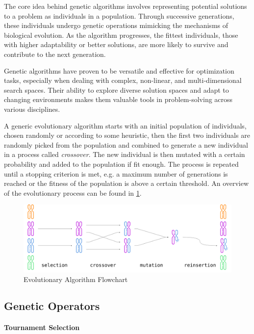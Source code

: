 The core idea behind genetic algorithms involves representing potential solutions to a problem as individuals in a population. Through successive generations, these individuals undergo genetic operations mimicking the mechanisms of biological evolution. As the algorithm progresses, the fittest individuals, those with higher adaptability or better solutions, are more likely to survive and contribute to the next generation.

Genetic algorithms have proven to be versatile and effective for optimization tasks, especially when dealing with complex, non-linear, and multi-dimensional search spaces. Their ability to explore diverse solution spaces and adapt to changing environments makes them valuable tools in problem-solving across various disciplines. \citep{gu_modified_2021}

A generic evolutionary algorithm starts with an initial population of individuals, chosen randomly or according to some heuristic, then the first two individuals are randomly picked from the population and combined to generate a new individual in a process called \textit{crossover}. The new individual is then mutated with a certain probability and added to the population if fit enough. The process is repeated until a stopping criterion is met, e.g. a maximum number of generations is reached or the fitness of the population is above a certain threshold. An overview of the evolutionary process can be found in \cref{fig:genetic_algo}.

\begin{figure}
    \centering
    \caption{Evolutionary Algorithm Flowchart}
    \label{fig:genetic_algo}
    \includegraphics[width=.9\textwidth]{Images/genetic_algo.png}
\end{figure}

\subsection{Genetic Operators}

\paragraph{Tournament Selection}

